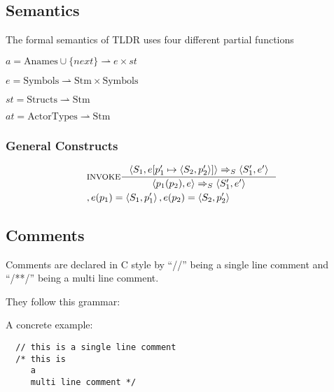 \subsection{Semantics}
The formal semantics of TLDR uses four different partial functions 

$a = \text{Anames} \cup \{next\} \rightharpoonup e \times st$

$e = \text{Symbols} \rightharpoonup \text{Stm} \times \text{Symbols}$

$st = \text{Structs} \rightharpoonup \text{Stm}$

$at = \text{ActorTypes} \rightharpoonup \text{Stm}$

\subsubsection{General Constructs}
\begin{align*}
&\inference[$\text{INVOKE}$]{\Braket{S_1,e[p_1' \mapsto \Braket{S_2,p_2'}]} \Rightarrow_S \Braket{S_1',e'}}
                  {\Braket{p_1(p_2),e} \Rightarrow_S \Braket{S_1',e'}}
\\
&									{,e(p_1) = \Braket{S_1,p_1'}, e(p_2) = \Braket{S_2,p_2'}}
\end{align*}

\subsection{Comments}
\label{subsec:comments}

Comments are declared in C style by \enquote{//} being a single line comment and \enquote{/**/} being a multi line comment.

They follow this grammar:


A concrete example:

\begin{verbatim}
  // this is a single line comment
  /* this is
     a
     multi line comment */
\end{verbatim}
